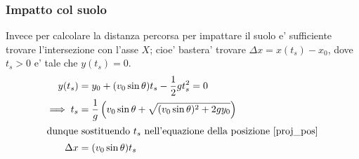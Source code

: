 \subsubsection{Impatto col suolo}
Invece per calcolare la distanza percorsa per impattare il suolo e' sufficiente trovare l'intersezione con l'asse $X$;
cioe' bastera' trovare $\Delta x = x(t_s)-x_0$, dove $t_s > 0$ e' tale che $y(t_s) = 0$.
\begin{alignat}
    {2}
             y(t_s) &= y_0 + (v_0\sin{\theta})t_s - \frac{1}{2}gt_s^2 = 0               \nonumber \\
    \implies t_s &= \frac{1}{g}\left(v_0\sin{\theta} + \sqrt{(v_0\sin{\theta})^2 + 2gy_0}\right)   \\
    \intertext{dunque sostituendo $t_s$ nell'equazione della posizione \ref{proj_pos}}
    \Delta x &= (v_0\sin{\theta})t_s   \label{impatto_proj_theta}
\end{alignat}